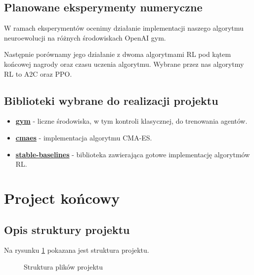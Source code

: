 \documentclass[12pt,a4paper]{article}
\begin{document}
\subsection{Planowane eksperymenty numeryczne}

W ramach eksperymentów ocenimy działanie implementacji naszego algorytmu
neuroewolucji na różnych środowiskach OpenAI gym.

Następnie porównamy jego działanie z dwoma algorytmami RL pod kątem
końcowej nagrody oraz czasu uczenia algorytmu. Wybrane przez nas
algorytmy RL to A2C oraz PPO.


\subsection{Biblioteki wybrane do realizacji projektu}

\begin{itemize}
  \item \textbf{\href{https://github.com/openai/gym}{gym}} - liczne środowiska, w tym kontroli klasycznej,
        do trenowania agentów.
  \item \textbf{\href{https://github.com/CyberAgentAILab/cmaes}{cmaes}} -
        implementacja algorytmu CMA-ES.
  \item \textbf{\href{https://github.com/DLR-RM/stable-baselines3}{stable-baselines}} -
        biblioteka zawierająca gotowe implementację algorytmów RL.
\end{itemize}

\pagebreak
\section{Project końcowy}

\subsection{Opis struktury projektu}

Na rysunku \ref{fig:dirtree} pokazana jest struktura projektu.

\begin{figure}[!ht]
  \caption{Struktura plików projektu}
  \label{fig:dirtree}
\end{figure}
\end{document}
